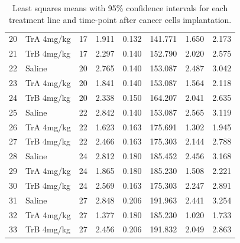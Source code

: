 \begin{table}
\begin{tabular}{rllrrrrr}
		20 & TrA 4mg/kg & 17        & 1.911  & 0.132 & 141.771 & 1.650    & 2.173    \\
		21 & TrB 4mg/kg & 17        & 2.297  & 0.140 & 152.790 & 2.020    & 2.575    \\
		22 & Saline     & 20        & 2.765  & 0.140 & 153.087 & 2.487    & 3.042    \\
		23 & TrA 4mg/kg & 20        & 1.841  & 0.140 & 153.087 & 1.564    & 2.118    \\
		24 & TrB 4mg/kg & 20        & 2.338  & 0.150 & 164.207 & 2.041    & 2.635    \\
		25 & Saline     & 22        & 2.842  & 0.140 & 153.087 & 2.565    & 3.119    \\
		26 & TrA 4mg/kg & 22        & 1.623  & 0.163 & 175.691 & 1.302    & 1.945    \\
		27 & TrB 4mg/kg & 22        & 2.466  & 0.163 & 175.303 & 2.144    & 2.788    \\
		28 & Saline     & 24        & 2.812  & 0.180 & 185.452 & 2.456    & 3.168    \\
		29 & TrA 4mg/kg & 24        & 1.865  & 0.180 & 185.230 & 1.508    & 2.221    \\
		30 & TrB 4mg/kg & 24        & 2.569  & 0.163 & 175.303 & 2.247    & 2.891    \\
		31 & Saline     & 27        & 2.848  & 0.206 & 191.963 & 2.441    & 3.254    \\
		32 & TrA 4mg/kg & 27        & 1.377  & 0.180 & 185.230 & 1.020    & 1.733    \\
		33 & TrB 4mg/kg & 27        & 2.456  & 0.206 & 191.832 & 2.049    & 2.863    \\
		\hline
	\end{tabular}
	\caption{Least squares means with 95\% confidence intervals for each treatment line and time-point after cancer cells implantation.}
	\label{effects_LME_factor_TrA_TrB_baseline_Saline}
\end{table}


